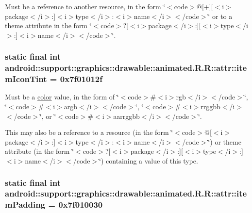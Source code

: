 Must be a reference to another resource, in the form \char`\"{}$<$code$>$@\mbox{[}+\mbox{]}\mbox{[}$<$i$>$package$<$/i$>$:\mbox{]}$<$i$>$type$<$/i$>$:$<$i$>$name$<$/i$>$$<$/code$>$\char`\"{} or to a theme attribute in the form \char`\"{}$<$code$>$?\mbox{[}$<$i$>$package$<$/i$>$:\mbox{]}\mbox{[}$<$i$>$type$<$/i$>$:\mbox{]}$<$i$>$name$<$/i$>$$<$/code$>$\char`\"{}. \hypertarget{classandroid_1_1support_1_1graphics_1_1drawable_1_1animated_1_1_r_1_1attr_edbabf23dad461fb9f185b74ce7e9416}{
\subsubsection[{itemIconTint}]{\setlength{\rightskip}{0pt plus 5cm}static final int android::support::graphics::drawable::animated.R.R::attr::itemIconTint = 0x7f01012f}}
\label{classandroid_1_1support_1_1graphics_1_1drawable_1_1animated_1_1_r_1_1attr_edbabf23dad461fb9f185b74ce7e9416}


Must be a \hyperlink{classandroid_1_1support_1_1graphics_1_1drawable_1_1animated_1_1_r_1_1color}{color} value, in the form of \char`\"{}$<$code$>$\#$<$i$>$rgb$<$/i$>$$<$/code$>$\char`\"{}, \char`\"{}$<$code$>$\#$<$i$>$argb$<$/i$>$$<$/code$>$\char`\"{}, \char`\"{}$<$code$>$\#$<$i$>$rrggbb$<$/i$>$$<$/code$>$\char`\"{}, or \char`\"{}$<$code$>$\#$<$i$>$aarrggbb$<$/i$>$$<$/code$>$\char`\"{}. 

This may also be a reference to a resource (in the form \char`\"{}$<$code$>$@\mbox{[}$<$i$>$package$<$/i$>$:\mbox{]}$<$i$>$type$<$/i$>$:$<$i$>$name$<$/i$>$$<$/code$>$\char`\"{}) or theme attribute (in the form \char`\"{}$<$code$>$?\mbox{[}$<$i$>$package$<$/i$>$:\mbox{]}\mbox{[}$<$i$>$type$<$/i$>$:\mbox{]}$<$i$>$name$<$/i$>$$<$/code$>$\char`\"{}) containing a value of this type. \hypertarget{classandroid_1_1support_1_1graphics_1_1drawable_1_1animated_1_1_r_1_1attr_bbf353ce05eb4ecfc9da7dad97e50279}{
\subsubsection[{itemPadding}]{\setlength{\rightskip}{0pt plus 5cm}static final int android::support::graphics::drawable::animated.R.R::attr::itemPadding = 0x7f010030}}
\label{classandroid_1_1support_1_1graphics_1_1drawable_1_1animated_1_1_r_1_1attr_bbf353ce05eb4ecfc9da7dad97e50279}


